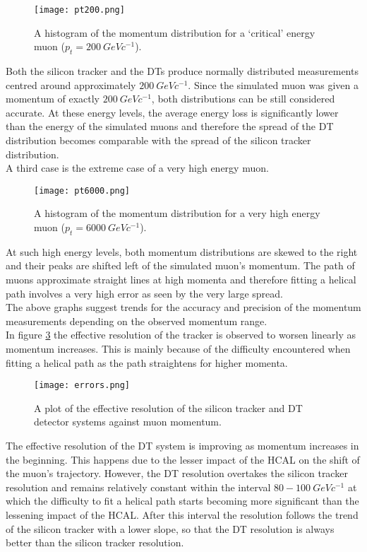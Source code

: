 \documentclass{article}
\begin{document}
\begin{figure}[h]
\centering
\texttt{[image: pt200.png]}
\caption{A histogram of the momentum distribution for a `critical' energy muon ($p_t=200\ GeVc^{-1}$).}
	\label{pt200}
\end{figure}

Both the silicon tracker and the DTs produce normally distributed measurements centred around approximately $200\ GeVc^{-1}$. Since the simulated muon was given a momentum of exactly $200\ GeVc^{-1}$, both distributions can be still considered accurate. At these energy levels, the average energy loss is significantly lower than the energy of the simulated muons and therefore the spread of the DT distribution becomes comparable with the spread of the silicon tracker distribution.\\

A third case is the extreme case of a very high energy muon.

\begin{figure}[h]
\centering
\texttt{[image: pt6000.png]}
\caption{A histogram of the momentum distribution for a very high energy muon ($p_t=6000\ GeVc^{-1}$).}
	\label{pt6000}
\end{figure}

At such high energy levels, both momentum distributions are skewed to the right and their peaks are shifted left of the simulated muon’s momentum. The path of muons approximate straight lines at high momenta and therefore fitting a helical path involves a very high error as seen by the very large spread.\\

The above graphs suggest trends for the accuracy and precision of the momentum measurements depending on the observed momentum range.\\

In figure \ref{errors} the effective resolution of the tracker is observed to worsen linearly as momentum increases. This is mainly because of the difficulty encountered when fitting a helical path as the path straightens for higher momenta.

\pagebreak

\begin{figure}[h]
\centering
\texttt{[image: errors.png]}
\caption{A plot of the effective resolution of the silicon tracker and DT detector systems against muon momentum.}
	\label{errors}
\end{figure}

The effective resolution of the DT system is improving as momentum increases in the beginning. This happens due to the lesser impact of the HCAL on the shift of the muon's trajectory. However, the DT resolution overtakes the silicon tracker resolution and remains relatively constant within the interval $80 - 100\ GeVc^{-1}$ at which the difficulty to fit a helical path starts becoming more significant than the lessening impact of the HCAL. After this interval the resolution follows the trend of the silicon tracker with a lower slope, so that the DT resolution is always better than the silicon tracker resolution.\\
\end{document}
